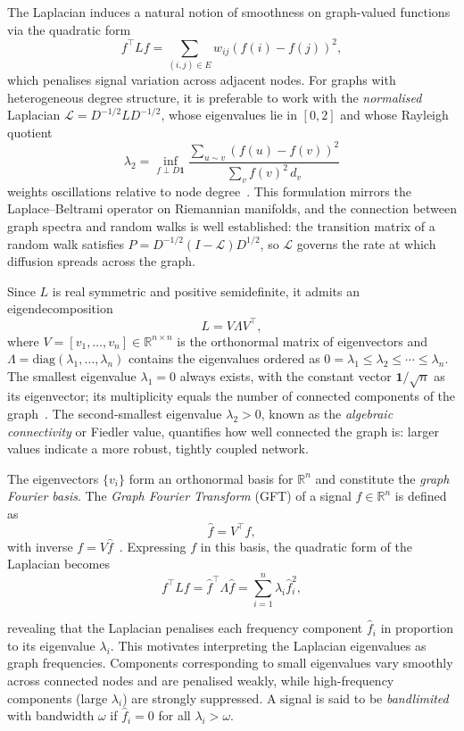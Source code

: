 \documentclass[11pt]{article}
\begin{document}
The Laplacian induces a natural notion of smoothness on graph-valued functions 
via the quadratic form
\[
    f^{\top}Lf = \sum_{(i,j)\in E} w_{ij}(f(i)-f(j))^2,
\]
which penalises signal variation across adjacent nodes. For graphs with 
heterogeneous degree structure, it is preferable to work with the 
\emph{normalised} Laplacian $\mathcal{L} = D^{-1/2}LD^{-1/2}$, whose 
eigenvalues lie in $[0,2]$ and whose Rayleigh quotient
\[
    \lambda_2 = \inf_{f \perp D\mathbf{1}}
    \frac{\displaystyle\sum_{u\sim v}(f(u)-f(v))^2}
         {\displaystyle\sum_v f(v)^2\,d_v}
\]
weights oscillations relative to node degree~\parencite{chung1997}.
This formulation mirrors the Laplace--Beltrami operator on Riemannian 
manifolds, and the connection between graph spectra and random walks is 
well established: the transition matrix of a random walk satisfies 
$P = D^{-1/2}(I - \mathcal{L})D^{1/2}$, so $\mathcal{L}$ governs the 
rate at which diffusion spreads across the graph.

Since $L$ is real symmetric and positive semidefinite, it admits an 
eigendecomposition
\[
    L = V \Lambda V^{\top},
\]
where $V = [v_1, \ldots, v_n] \in \mathbb{R}^{n \times n}$ is the 
orthonormal matrix of eigenvectors and 
$\Lambda = \mathrm{diag}(\lambda_1, \ldots, \lambda_n)$ contains the 
eigenvalues ordered as $0 = \lambda_1 \leq \lambda_2 \leq \cdots \leq 
\lambda_n$. The smallest eigenvalue $\lambda_1 = 0$ always exists, with 
the constant vector $\mathbf{1}/\sqrt{n}$ as its eigenvector; its 
multiplicity equals the number of connected components of the 
graph~\parencite{chung1997}. The second-smallest eigenvalue 
$\lambda_2 > 0$, known as the \emph{algebraic connectivity} or Fiedler 
value, quantifies how well connected the graph is: larger values indicate 
a more robust, tightly coupled network.

The eigenvectors $\{v_i\}$ form an orthonormal basis for $\mathbb{R}^n$ 
and constitute the \emph{graph Fourier basis}. The \emph{Graph 
Fourier Transform} (GFT) of a signal $f \in \mathbb{R}^n$ is defined as
\[
    \hat{f} = V^{\top} f,
\]
with inverse $f = V\hat{f}$~\parencite{shuman2013emerging}. Expressing 
$f$ in this basis, the quadratic form of the Laplacian becomes
\[
    f^{\top} L f 
    = \hat{f}^{\top} \Lambda \hat{f} 
    = \sum_{i=1}^{n} \lambda_i \hat{f}_i^2,
\]

revealing that the Laplacian penalises each frequency component
$\hat{f}_i$ in proportion to its eigenvalue $\lambda_i$. This
motivates interpreting the Laplacian eigenvalues as graph frequencies.
Components corresponding to small eigenvalues vary smoothly across
connected nodes and are penalised weakly, while high-frequency
components (large $\lambda_i$) are strongly suppressed. A signal is said
to be \emph{bandlimited} with bandwidth $\omega$ if $\hat{f}_i = 0$ for
all $\lambda_i > \omega$.
\end{document}
